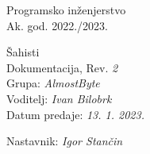 \documentclass{article}
\begin{document}
\newenvironment{packed_enum}{
	\begin{enumerate}
		\setlength{\itemsep}{0pt}
		\setlength{\parskip}{0pt}
		\setlength{\parsep}{0pt}
	}{\end{enumerate}}

\newenvironment{packed_item}{
	\begin{itemize}
		\setlength{\itemsep}{0pt}
		\setlength{\parskip}{0pt}
		\setlength{\parsep}{0pt}
	}{\end{itemize}}
	
		\begin{titlepage}
		\begin{center}
			\LARGE Programsko inženjerstvo\\
			\large Ak. god. 2022./2023.\\
			
			
			\huge Šahisti\\
			\Large Dokumentacija, Rev. \textit{2}\\
			
			\normalsize
			Grupa: \textit{AlmostByte}\\
			Voditelj: \textit{Ivan Bilobrk}\\
			
			
			Datum predaje: \textit{13. 1. 2023.}\\
			
			
			Nastavnik: \textit{Igor Stančin}\\
			
		\end{center}
		
		
	\end{titlepage}

	\tableofcontents
	\eject
		
\end{document}
